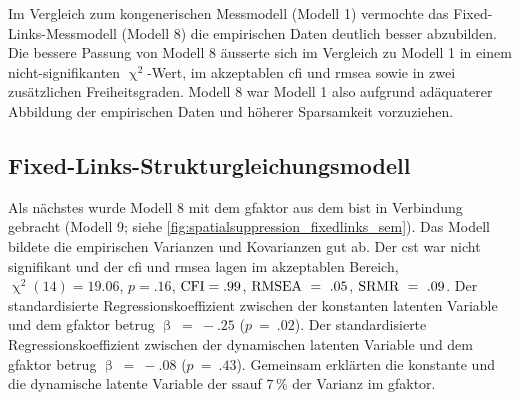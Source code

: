 \documentclass[11pt, twoside, a4paper]{book}		%
\begin{document}
Im Vergleich zum kongenerischen Messmodell (Modell 1) vermochte das Fixed-Links-Messmodell (Modell 8) die empirischen Daten deutlich besser abzubilden. Die bessere Passung von Modell 8 äusserte sich im Vergleich zu Modell 1 in einem nicht-signifikanten $\upchi^2$-Wert, im akzeptablen \gls{cfi} und \gls{rmsea} sowie in zwei zusätzlichen Freiheitsgraden. Modell 8 war Modell 1 also aufgrund adäquaterer Abbildung der empirischen Daten und höherer Sparsamkeit vorzuziehen.



\subsection{Fixed-Links-Strukturgleichungsmodell}

Als nächstes wurde Modell 8 mit dem \gls{gfaktor} aus dem \gls{bist} in Verbindung gebracht (Modell 9; siehe \autoref{fig:spatialsuppression_fixedlinks_sem}).
Das Modell bildete die empirischen Varianzen und Kovarianzen gut ab. Der \gls{cst} war nicht signifikant und der \gls{cfi} und \gls{rmsea} lagen im akzeptablen Bereich, $\upchi^2(14)=19.06$, $p=.16$, $\textnormal{CFI}=.99$, $\textnormal{RMSEA}~=~.05$, $\textnormal{SRMR}~=~.09$. 
Der standardisierte Regressionskoeffizient zwischen der konstanten latenten Variable und dem \gls{gfaktor} betrug $\upbeta~=~-.25$ ($p~=~.02$). Der standardisierte Regressionskoeffizient zwischen der dynamischen latenten Variable und dem \gls{gfaktor} betrug $\upbeta~=~-.08$ ($p~=~.43$).
Gemeinsam erklärten die konstante und die dynamische latente Variable der \gls{ssauf} $7\,\%$ der Varianz im \gls{gfaktor}.
\end{document}
